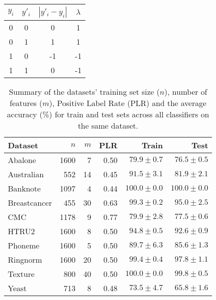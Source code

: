 \begin{table}
    \footnotesize
    \centering
    \caption{}
    \begin{tabular}{c|c|c|c}
        \toprule
        $y_i$ & $y'_i$ & $|y'_i-y_i|$ & $\lambda$ \\
        \midrule
        0 & 0 & 0 & 1 \\
        0 & 1 & 1 & 1 \\
        1 & 0 & -1 & -1 \\
        1 & 1 & 0 & -1 \\
        \bottomrule
    \end{tabular}
    \label{table.y}
\end{table}


\begin{table}[t!]
    \footnotesize
    \centering
    \caption{Summary of the datasets' training set size ($n$), number of features ($m$), Positive Label Rate (PLR) and the average accuracy (\%) for train and test sets across all classifiers on the same dataset.}
    \begin{tabular}{l|r|r|r|r|r}
        \toprule
        Dataset      & $n$  & $m$ & PLR  & Train & Test \\
        \midrule
        Abalone      & 1600 & 7   & 0.50 & $79.9\pm0.7$ &  $76.5\pm0.5$ \\
        Australian   & 552  & 14  & 0.45 & $91.5\pm3.1$ &  $81.9\pm2.1$ \\
        Banknote     & 1097 & 4   & 0.44 & $100.0\pm0.0$ & $100.0\pm0.0$ \\
        Breastcancer & 455  & 30  & 0.63 & $99.3\pm0.2$ &  $95.0\pm2.5$ \\
        CMC          & 1178 & 9   & 0.77 & $79.9\pm2.8$ &  $77.5\pm0.6$ \\
        HTRU2        & 1600 & 8   & 0.50 & $94.8\pm0.5$ &  $92.6\pm0.9$ \\
        Phoneme      & 1600 & 5   & 0.50 & $89.7\pm6.3$ &  $85.6\pm1.3$ \\
        Ringnorm     & 1600 & 20  & 0.50 & $99.4\pm0.4$ &  $97.8\pm1.1$ \\
        Texture      & 800  & 40  & 0.50 & $100.0\pm0.0$ &  $99.8\pm0.5$ \\
        Yeast        & 713  & 8   & 0.48 & $73.5\pm4.7$ &  $65.8\pm1.6$ \\
        \bottomrule
    \end{tabular}
    \label{tab.datasets}
\end{table}


